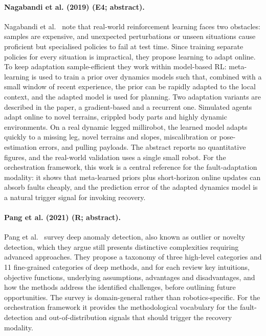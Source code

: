 \documentclass[10pt,a4paper]{article}
\begin{document}
\paragraph{Nagabandi et al. (2019) (E4; abstract).} Nagabandi et al.~\cite{Nagabandi2019} note that real-world reinforcement learning faces two obstacles: samples are expensive, and unexpected perturbations or unseen situations cause proficient but specialised policies to fail at test time. Since training separate policies for every situation is impractical, they propose learning to adapt online. To keep adaptation sample-efficient they work within model-based RL: meta-learning is used to train a prior over dynamics models such that, combined with a small window of recent experience, the prior can be rapidly adapted to the local context, and the adapted model is used for planning. Two adaptation variants are described in the paper, a gradient-based and a recurrent one. Simulated agents adapt online to novel terrains, crippled body parts and highly dynamic environments. On a real dynamic legged millirobot, the learned model adapts quickly to a missing leg, novel terrains and slopes, miscalibration or pose-estimation errors, and pulling payloads. The abstract reports no quantitative figures, and the real-world validation uses a single small robot. For the orchestration framework, this work is a central reference for the fault-adaptation modality: it shows that meta-learned priors plus short-horizon online updates can absorb faults cheaply, and the prediction error of the adapted dynamics model is a natural trigger signal for invoking recovery.

\paragraph{Pang et al. (2021) (R; abstract).} Pang et al.~\cite{Pang2021} survey deep anomaly detection, also known as outlier or novelty detection, which they argue still presents distinctive complexities requiring advanced approaches. They propose a taxonomy of three high-level categories and 11 fine-grained categories of deep methods, and for each review key intuitions, objective functions, underlying assumptions, advantages and disadvantages, and how the methods address the identified challenges, before outlining future opportunities. The survey is domain-general rather than robotics-specific. For the orchestration framework it provides the methodological vocabulary for the fault-detection and out-of-distribution signals that should trigger the recovery modality.
\end{document}
